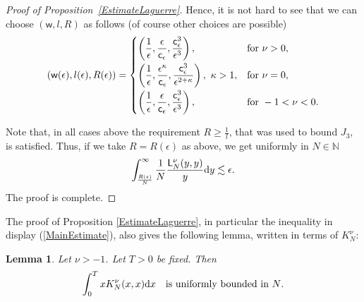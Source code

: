 \documentclass[pdftex]{sigma}
\numberwithin{equation}{section}
\newtheorem{Lemma}[Theorem]{Lemma}
\begin{document}
\begin{proof}[Proof of Proposition~\ref{EstimateLaguerre}]
Hence, it is not hard to see that we can choose $(\mathsf{w},l,R)$ as follows (of course other choices are possible)
\begin{gather}\label{ChoiceOfConstants}
(\mathsf{w}(\epsilon),l(\epsilon),R(\epsilon))=\begin{cases}
\displaystyle \left(\frac{1}{\epsilon},\frac{\epsilon}{\mathsf{c}_{\epsilon}}, \frac{\mathsf{c}_{\epsilon}^3}{\epsilon^3}\right), &\text{for } \nu>0,\vspace{1mm}\\
\displaystyle\left(\frac{1}{\epsilon},\frac{\epsilon^{\kappa}}{\mathsf{c}_{\epsilon}}, \frac{\mathsf{c}_{\epsilon}^3}{\epsilon^{2+\kappa}}\right), \ \kappa>1, &\text{for } \nu=0,\vspace{1mm}\\
\displaystyle\left(\frac{1}{\epsilon},\frac{\epsilon}{\mathsf{c}_{\epsilon}}, \frac{\mathsf{c}_{\epsilon}^3}{\epsilon^3}\right), &\text{for } -1<\nu<0.
\end{cases}
\end{gather}

Note that, in all cases above the requirement $R\ge \frac{1}{l}$, that was used to bound $J_3$, is satisfied. Thus, if we take $R=R(\epsilon)$ as above, we get uniformly in $N \in \mathbb{N}$
\begin{gather*}
\int_{\frac{R(\epsilon)}{N}}^{\infty}\frac{1}{N}\frac{\mathsf{L}_N^{\nu}(y,y)}{y}{\rm d}y \lesssim \epsilon.
\end{gather*}
The proof is complete.
\end{proof}

The proof of Proposition \ref{EstimateLaguerre}, in particular the inequality in display (\ref{MainEstimate}), also gives the following lemma, written in terms of $K_N^{\nu}$:

\begin{Lemma}\label{LemmaUniformBoundedness}
Let $\nu>-1$. Let $T>0$ be fixed. Then
\begin{gather*}
\int_{0}^{T}xK^{\nu}_N(x,x){\rm d}x \quad \text{is uniformly bounded in $N$}.
\end{gather*}
\end{Lemma}
\end{document}
